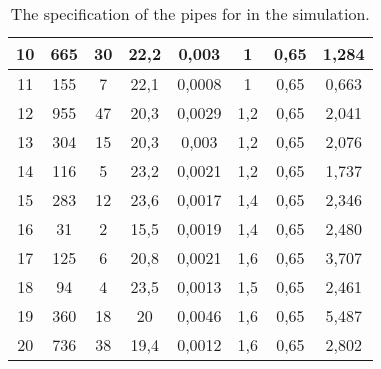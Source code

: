\begin{table}[H]
\begin{tabular}{|c|c|c|c|c|c|c|c|}
10                                                         & 665            & 30       & 22,2       & 0,003  & 1         & 0,65     & 1,284                                                                          \\ \hline
11                                                         & 155            & 7        & 22,1       & 0,0008 & 1         & 0,65     & 0,663                                                                          \\ \hline
12                                                         & 955            & 47       & 20,3       & 0,0029 & 1,2       & 0,65     & 2,041                                                                          \\ \hline
13                                                         & 304            & 15       & 20,3       & 0,003  & 1,2       & 0,65     & 2,076                                                                          \\ \hline
14                                                         & 116            & 5        & 23,2       & 0,0021 & 1,2       & 0,65     & 1,737                                                                          \\ \hline
15                                                         & 283            & 12       & 23,6       & 0,0017 & 1,4       & 0,65     & 2,346                                                                          \\ \hline
16                                                         & 31             & 2        & 15,5       & 0,0019 & 1,4       & 0,65     & 2,480                                                                          \\ \hline
17                                                         & 125            & 6        & 20,8       & 0,0021 & 1,6       & 0,65     & 3,707                                                                          \\ \hline
18                                                         & 94             & 4        & 23,5       & 0,0013 & 1,5       & 0,65     & 2,461                                                                          \\ \hline
19                                                         & 360            & 18       & 20         & 0,0046 & 1,6       & 0,65     & 5,487                                                                          \\ \hline
20                                                         & 736            & 38       & 19,4         & 0,0012 & 1,6       & 0,65     & 2,802                                                                          \\ \hline
\end{tabular}
\caption{The specification of the pipes for in the simulation.}
\label{tab:pipe_data_nonlinear_linear_testv2}
\end{table}

